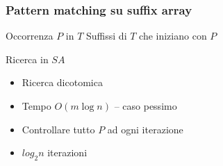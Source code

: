 \begin{frame}[fragile]
\begin{columns}
\begin{column}{0.5\textwidth}
\begin{center}
\end{center}
\end{column}
\end{columns}
\end{frame}

\begin{frame}[fragile]
\frametitle{Pattern matching su suffix array}
\begin{block}{Occorrenza $P$ in $T$}
Suffissi di $T$ che iniziano con $P$
\end{block}
\begin{block}{Ricerca in $SA$}
\begin{itemize}
\item
Ricerca dicotomica
\item
Tempo $O(m \log n)$ -- caso pessimo
\item
Controllare tutto $P$ ad ogni iterazione
\item
$log_{2} n$ iterazioni
\end{itemize}
\end{block}
\end{frame}

